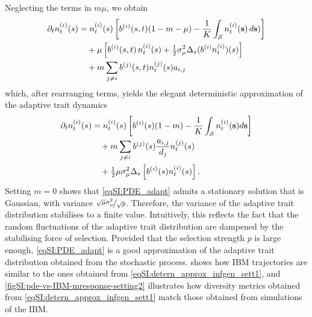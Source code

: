 Neglecting the terms in $m \mu$, we obtain
%
\begin{equation}
  \begin{split}
    \partial_t n_t^{(i)}(s) &= n_t^{(i)}(s)\left[b^{(i)}(s,t)(1-m - \mu) - \frac{1}{K} \int_\mathcal{S} n_t^{(i)}({\textbf s}) \, d {\textbf s})\right] \\
    & \quad + \mu \left[ b^{(i)}(s,t) \, n_t^{(i)}(s) + \tfrac{1}{2} \sigma_\mu^2 \Delta_s (b^{(i)} n_t^{(i)})(s) \right] \\
    & \quad + m \sum_{j \neq i} b^{(j)}(s,t) n_t^{(j)}(s) a_{i,j}
    \end{split}
\end{equation}
which, after rearranging terms, yields the elegant deterministic approximation of the adaptive trait dynamics
%
\begin{equation}\label{eqSI:PDE_adapt}
  \begin{split}
    \partial_t n_t^{(i)}(s) &=n_t^{(i)} (s) \left[b^{(i)}(s)(1-m) -  \frac{1}{K}\int_\mathcal{S}  n_t^{(i)}({\textbf s}) d{\textbf s}  \right] \\
    & \quad + m \sum_{j\neq i} b^{(j)}(s) \frac{a_{i,j}}{d_j} n_t^{(j)}(s) \\
    & \quad + \tfrac{1}{2} \mu \sigma_\mu^2 \Delta_s \left[ b^{(i)}(s) n^{(i)}_t(s) \right].
  \end{split}
\end{equation}
%
Setting $m = 0$ \citep{Mirrahimi2020} shows that \cref{eqSI:PDE_adapt} admits a stationary solution that is Gaussian, with variance $ \nicefrac{\sqrt{\mu} \sigma_\mu^2}{\sqrt{p}}$. 
%
Therefore, the variance of the adaptive trait distribution stabilises to a finite value. Intuitively, this reflects the fact that the random fluctuations of the adaptive trait distribution are dampened by the stabilising force of selection. Provided that the selection strength $p$ is large enough, \cref{eqSI:PDE_adapt} is a good approximation of the adaptive trait distribution obtained from the stochastic process.
%
 shows how IBM trajectories are similar to the ones obtained from \cref{eqSI:detern_approx_infgen_sett1}, and \cref{figSI:pde-vs-IBM-mresponse-setting2} illustrates how diversity metrics obtained from \cref{eqSI:detern_approx_infgen_sett1} match those obtained from simulations of the IBM.


